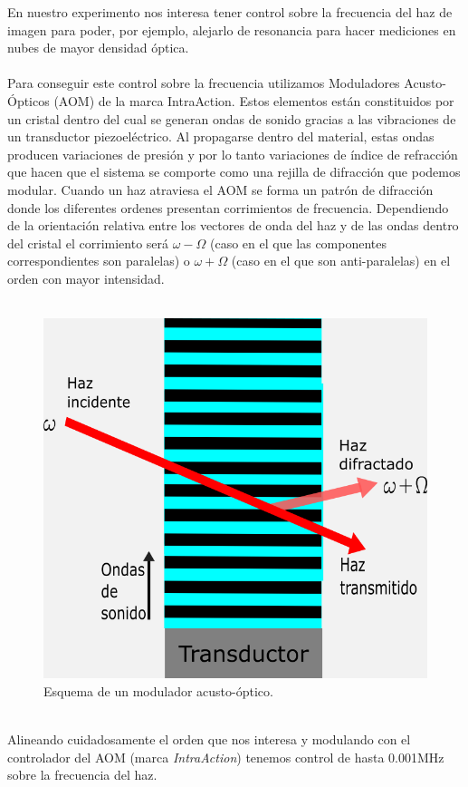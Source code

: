 \documentclass[12pt,twoside]{article}
\begin{document}
En nuestro experimento nos interesa tener control sobre la frecuencia del haz de imagen para poder, por ejemplo, alejarlo de resonancia para hacer mediciones en nubes de mayor densidad óptica.\\
\\
Para conseguir este control sobre la frecuencia utilizamos Moduladores Acusto-Ópticos (AOM) de la marca IntraAction. Estos elementos están constituidos por un cristal dentro del cual se generan ondas de sonido gracias a las vibraciones de un transductor piezoeléctrico. Al propagarse dentro del material, estas ondas producen variaciones de presión y por lo tanto variaciones de índice de refracción que hacen que el sistema se comporte como una rejilla de difracción que podemos modular. Cuando un haz atraviesa el AOM se forma un patrón de difracción donde los diferentes ordenes presentan corrimientos de frecuencia. Dependiendo de la orientación relativa entre los vectores de onda del haz y de las ondas dentro del cristal el corrimiento será $\omega - \Omega $ (caso en el que las componentes correspondientes son paralelas) o $\omega + \Omega $ (caso en el que son anti-paralelas) en el orden con mayor intensidad.\\
\\
\begin{figure}[h]
    \begin{center}
        \includegraphics[width=0.6\linewidth]{Esquemaaom.png}
    \end{center}
    \caption{Esquema de un modulador acusto-óptico. }
    \label{esqaom}
\end{figure} \\
\newpage
Alineando cuidadosamente el orden que nos interesa y modulando con el controlador del AOM (marca \textit{IntraAction}) tenemos control de hasta 0.001MHz sobre la frecuencia del haz. \\
\end{document}
